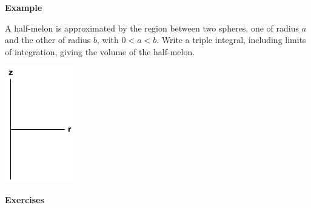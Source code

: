 \documentclass[12pt,letterpaper,noanswers]{exam}
\begin{document}













\noindent\textbf{Example}

A half-melon is approximated by the region between two spheres, one of radius $a$ and the other of radius $b$, with $0<a<b$.  Write a triple integral, including limits of integration, giving the volume of the half-melon.

\includegraphics[height=2in]{img/C13rzaxes.png}

\noindent\textbf{Exercises}
\end{document}
